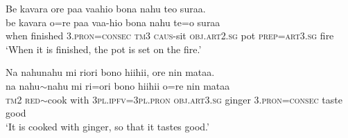 \ea\label{ex:text19-58}
Be kavara ore paa vaahio bona nahu teo suraa.\\
\gll be	kavara	o=re	paa	vaa-hio	bona	nahu	te=o	suraa\\
     when	finished	3.\textsc{pron}=\textsc{consec}	\textsc{tm}3	\textsc{caus}-sit	\textsc{obj}.\textsc{art}2.\textsc{sg}	pot	\textsc{prep}=\textsc{art}3.\textsc{sg}	fire\\
\glt `When it is finished, the pot is set on the fire.'
\z

\ea\label{ex:text19-59}
Na nahunahu mi riori bono hiihii, ore nin mataa.\\
\gll na	nahu{$\sim$}nahu	mi	ri=ori	bono	hiihii	o=re	nin	mataa\\
     \textsc{tm}2	\textsc{red}{$\sim$}cook	with	3\textsc{pl}.\textsc{ipfv}=3\textsc{pl}.\textsc{pron}	\textsc{obj}.\textsc{art}3.\textsc{sg}	ginger	3.\textsc{pron}=\textsc{consec}	taste	good\\
\glt `It is cooked with ginger, so that it tastes good.'
\z

